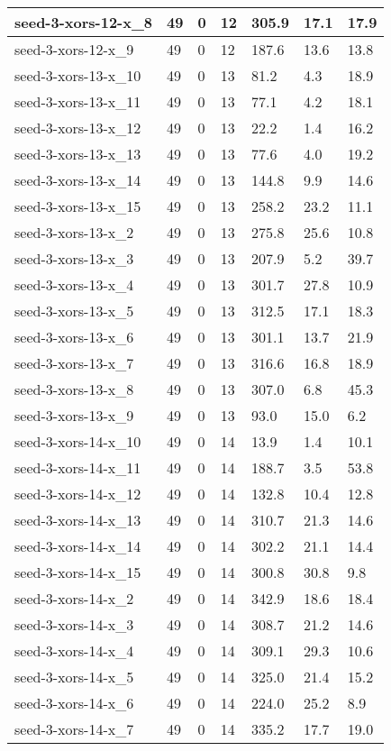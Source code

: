 \begin{scriptsize}
\begin{longtable}{|p{5cm}|l|l|l|l|l|l|}
seed-3-xors-12-x\_8&49&0&12&305.9&17.1&17.9 \\ \hline 
seed-3-xors-12-x\_9&49&0&12&187.6&13.6&13.8 \\ \hline 
seed-3-xors-13-x\_10&49&0&13&81.2&4.3&18.9 \\ \hline 
seed-3-xors-13-x\_11&49&0&13&77.1&4.2&18.1 \\ \hline 
seed-3-xors-13-x\_12&49&0&13&22.2&1.4&16.2 \\ \hline 
seed-3-xors-13-x\_13&49&0&13&77.6&4.0&19.2 \\ \hline 
seed-3-xors-13-x\_14&49&0&13&144.8&9.9&14.6 \\ \hline 
seed-3-xors-13-x\_15&49&0&13&258.2&23.2&11.1 \\ \hline 
seed-3-xors-13-x\_2&49&0&13&275.8&25.6&10.8 \\ \hline 
seed-3-xors-13-x\_3&49&0&13&207.9&5.2&39.7 \\ \hline 
seed-3-xors-13-x\_4&49&0&13&301.7&27.8&10.9 \\ \hline 
seed-3-xors-13-x\_5&49&0&13&312.5&17.1&18.3 \\ \hline 
seed-3-xors-13-x\_6&49&0&13&301.1&13.7&21.9 \\ \hline 
seed-3-xors-13-x\_7&49&0&13&316.6&16.8&18.9 \\ \hline 
seed-3-xors-13-x\_8&49&0&13&307.0&6.8&45.3 \\ \hline 
seed-3-xors-13-x\_9&49&0&13&93.0&15.0&6.2 \\ \hline 
seed-3-xors-14-x\_10&49&0&14&13.9&1.4&10.1 \\ \hline 
seed-3-xors-14-x\_11&49&0&14&188.7&3.5&53.8 \\ \hline 
seed-3-xors-14-x\_12&49&0&14&132.8&10.4&12.8 \\ \hline 
seed-3-xors-14-x\_13&49&0&14&310.7&21.3&14.6 \\ \hline 
seed-3-xors-14-x\_14&49&0&14&302.2&21.1&14.4 \\ \hline 
seed-3-xors-14-x\_15&49&0&14&300.8&30.8&9.8 \\ \hline 
seed-3-xors-14-x\_2&49&0&14&342.9&18.6&18.4 \\ \hline 
seed-3-xors-14-x\_3&49&0&14&308.7&21.2&14.6 \\ \hline 
seed-3-xors-14-x\_4&49&0&14&309.1&29.3&10.6 \\ \hline 
seed-3-xors-14-x\_5&49&0&14&325.0&21.4&15.2 \\ \hline 
seed-3-xors-14-x\_6&49&0&14&224.0&25.2&8.9 \\ \hline 
seed-3-xors-14-x\_7&49&0&14&335.2&17.7&19.0 \\ \hline 

\end{longtable}
\end{scriptsize}
